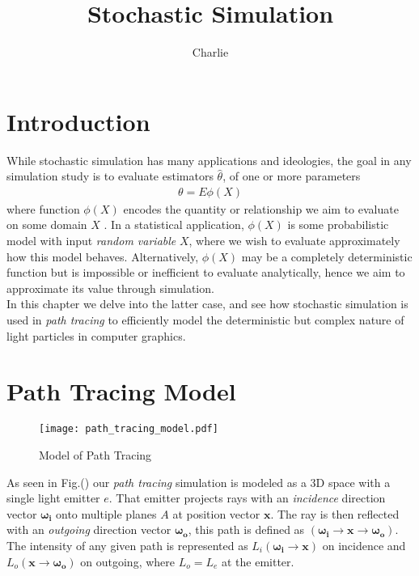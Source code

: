 \documentclass{article}
\author{Charlie}
\title{\vspace{-3cm}Stochastic Simulation}
\begin{document}


\section{Introduction}
While stochastic simulation has many applications and ideologies,
the goal in any simulation study is to evaluate estimators $\hat{\theta}$, 
of one or more parameters 
\begin{align}
    \theta = E\phi(X) \label{eq: expectation of loss function}
\end{align} 
where function $\phi(X)$ encodes the quantity or relationship we aim to evaluate 
on some domain $X$ \cite{alma9946168020001381}.
In a statistical application, $\phi(X)$ is some probabilistic model with input 
\textit{random variable} $X$,
where we wish to evaluate approximately how this model behaves.
Alternatively, $\phi(X)$ may be a completely deterministic function but is impossible or inefficient
to evaluate analytically, hence we aim to approximate its value through simulation.  
\\
In this chapter we delve into the latter case, and see how stochastic simulation 
is used in \textit{path tracing} to efficiently model the deterministic but complex nature 
of light particles in computer graphics.

\section{Path Tracing Model}

\begin{figure}[h]
    \centering
    \caption{Model of Path Tracing}
    \texttt{[image: path\_tracing\_model.pdf]}
\end{figure}

As seen in Fig.() our \textit{path tracing} simulation is modeled as a 3D 
space with a single light emitter $e$.
That emitter projects rays with an \textit{incidence} direction vector $\boldsymbol{\omega_i}$
onto multiple planes $A$ at position vector $\boldsymbol{x}$.
The ray is then reflected with an \textit{outgoing} direction vector $\boldsymbol{\omega_o}$,
this path is defined as $(\boldsymbol{\omega_i}\rightarrow\boldsymbol{x}\rightarrow\boldsymbol{\omega_o})$.
The intensity of any given path is represented as $L_i(\boldsymbol{\omega_i}\rightarrow\boldsymbol{x})$
on incidence and $L_o(\boldsymbol{x}\rightarrow\boldsymbol{\omega_o})$ on outgoing, where 
$L_o=L_e$ at the emitter. 
\end{document}
